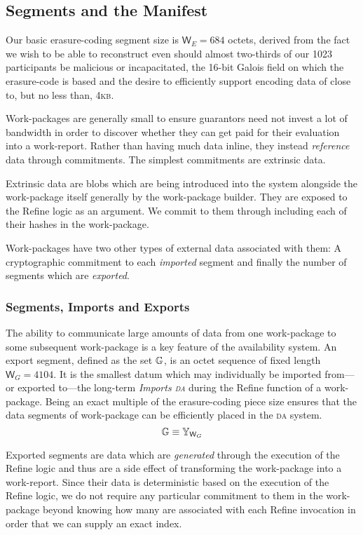 \subsection{Segments and the Manifest}

Our basic erasure-coding segment size is $\mathsf{W}_E = 684$ octets, derived from the fact we wish to be able to reconstruct even should almost two-thirds of our 1023 participants be malicious or incapacitated, the 16-bit Galois field on which the erasure-code is based and the desire to efficiently support encoding data of close to, but no less than, 4\textsc{kb}.

Work-packages are generally small to ensure guarantors need not invest a lot of bandwidth in order to discover whether they can get paid for their evaluation into a work-report. Rather than having much data inline, they instead \emph{reference} data through commitments. The simplest commitments are extrinsic data.

Extrinsic data are blobs which are being introduced into the system alongside the work-package itself generally by the work-package builder. They are exposed to the Refine logic as an argument. We commit to them through including each of their hashes in the work-package.

Work-packages have two other types of external data associated with them: A cryptographic commitment to each \emph{imported} segment and finally the number of segments which are \emph{exported}.

\subsubsection{Segments, Imports and Exports}

The ability to communicate large amounts of data from one work-package to some subsequent work-package is a key feature of the \Jam availability system. An export segment, defined as the set $\mathbb{G}$, is an octet sequence of fixed length $\mathsf{W}_G = 4104$. It is the smallest datum which may individually be imported from---or exported to---the long-term \emph{Imports \textsc{da}} during the Refine function of a work-package. Being an exact multiple of the erasure-coding piece size ensures that the data segments of work-package can be efficiently placed in the \textsc{da} system.
\begin{equation}\label{eq:segment}
  \mathbb{G} \equiv \mathbb{Y}_{\mathsf{W}_G}
\end{equation}

Exported segments are data which are \emph{generated} through the execution of the Refine logic and thus are a side effect of transforming the work-package into a work-report. Since their data is deterministic based on the execution of the Refine logic, we do not require any particular commitment to them in the work-package beyond knowing how many are associated with each Refine invocation in order that we can supply an exact index.

